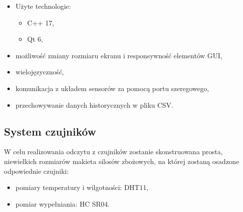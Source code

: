         \begin{itemize}
            \item Użyte technologie: 
            \begin{itemize}
                \item C++ 17,
                \item Qt 6,
            \end{itemize}
            \item możliwość zmiany rozmiaru ekranu i responsywność elementów GUI,
            \item wielojęzyczność,
            \item komunikacja z układem sensorów za pomocą portu szeregowego,
            \item przechowywanie danych historycznych w pliku CSV.
        \end{itemize}

    \subsection{System czujników}
        W celu realizowania odczytu z czujników zostanie skonstruowana prosta, niewielkich rozmiarów makieta silosów zbożowych, na której 
        zostaną osadzone odpowiednie czujniki:
        \begin{itemize}
            \item pomiary temperatury i wilgotności: DHT11,
            \item pomiar wypełniania: HC SR04.
        \end{itemize}
    
    